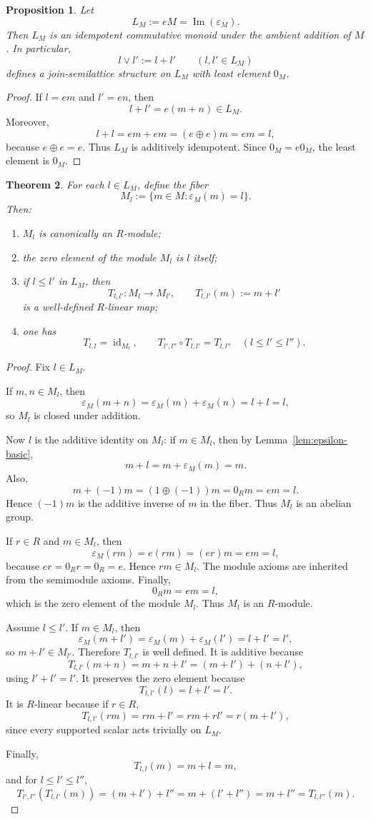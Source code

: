 \documentclass[11pt]{amsart}
\numberwithin{equation}{section}
\newtheorem{theorem}{Theorem}[section]
\newtheorem{proposition}[theorem]{Proposition}
\theoremstyle{definition}
\newcommand{\im}{\operatorname{Im}}
\newcommand{\id}{\operatorname{id}}
\begin{document}
\begin{proposition}\label{prop:support-semilattice}
Let
\[
L_M:=eM=\im(\varepsilon_M).
\]
Then $L_M$ is an idempotent commutative monoid under the ambient addition of $M$. In particular,
\[
l\vee l':=l+l'
\qquad(l,l'\in L_M)
\]
defines a join-semilattice structure on $L_M$ with least element $0_M$.
\end{proposition}

\begin{proof}
If $l=em$ and $l'=en$, then
\[
l+l'=e(m+n)\in L_M.
\]
Moreover,
\[
l+l=em+em=(e\oplus e)m=em=l,
\]
because $e\oplus e=e$. Thus $L_M$ is additively idempotent. Since $0_M=e0_M$, the least element is $0_M$. 
\end{proof}

\begin{theorem}\label{thm:fiber-modules}
For each $l\in L_M$, define the fiber
\[
M_l:=\{m\in M:\varepsilon_M(m)=l\}.
\]
Then:
\begin{enumerate}[label=(\arabic*)]
    \item $M_l$ is canonically an $R$-module;
    \item the zero element of the module $M_l$ is $l$ itself;
    \item if $l\le l'$ in $L_M$, then
    \[
    T_{l,l'}:M_l\to M_{l'},
    \qquad
    T_{l,l'}(m):=m+l'
    \]
    is a well-defined $R$-linear map;
    \item one has
    \[
    T_{l,l}=\id_{M_l},
    \qquad
    T_{l',l''}\circ T_{l,l'}=T_{l,l''}
    \quad(l\le l'\le l'').
    \]
\end{enumerate}
\end{theorem}

\begin{proof}
Fix $l\in L_M$.

If $m,n\in M_l$, then
\[
\varepsilon_M(m+n)=\varepsilon_M(m)+\varepsilon_M(n)=l+l=l,
\]
so $M_l$ is closed under addition.

Now $l$ is the additive identity on $M_l$: if $m\in M_l$, then by Lemma~\ref{lem:epsilon-basic},
\[
m+l=m+\varepsilon_M(m)=m.
\]
Also,
\[
m+(-1)m=(1\oplus(-1))m=0_Rm=em=l.
\]
Hence $(-1)m$ is the additive inverse of $m$ in the fiber. Thus $M_l$ is an abelian group.

If $r\in R$ and $m\in M_l$, then
\[
\varepsilon_M(rm)=e(rm)=(er)m=em=l,
\]
because $er=0_Rr=0_R=e$. Hence $rm\in M_l$. The module axioms are inherited from the semimodule axioms. Finally,
\[
0_Rm=em=l,
\]
which is the zero element of the module $M_l$. Thus $M_l$ is an $R$-module.

Assume $l\le l'$. If $m\in M_l$, then
\[
\varepsilon_M(m+l')=\varepsilon_M(m)+\varepsilon_M(l')=l+l'=l',
\]
so $m+l'\in M_{l'}$. Therefore $T_{l,l'}$ is well defined. It is additive because
\[
T_{l,l'}(m+n)=m+n+l'=(m+l')+(n+l'),
\]
using $l'+l'=l'$. It preserves the zero element because
\[
T_{l,l'}(l)=l+l'=l'.
\]
It is $R$-linear because if $r\in R$,
\[
T_{l,l'}(rm)=rm+l'=rm+rl'=r(m+l'),
\]
since every supported scalar acts trivially on $L_M$.

Finally,
\[
T_{l,l}(m)=m+l=m,
\]
and for $l\le l'\le l''$,
\[
T_{l',l''}(T_{l,l'}(m))=(m+l')+l''=m+(l'+l'')=m+l''=T_{l,l''}(m).
\]

\end{proof}
\end{document}
